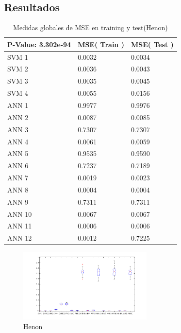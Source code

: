 \documentclass[a4paper,openwrite,12pt]{article}
\begin{document}
\subsection{Resultados}
\begin{table}[H]
\centering
\begin{tabular}{@{}lll@{}}
\toprule
P-Value: 3.302e-94       & MSE( Train ) & MSE( Test ) \\ \midrule
SVM 1                    & 0.0032            & 0.0034           \\
SVM 2                    & 0.0036            & 0.0043           \\
SVM 3                    & 0.0035            & 0.0045           \\
SVM 4                    & 0.0055            & 0.0156           \\
ANN 1                    & 0.9977            & 0.9976           \\
ANN 2                    & 0.0087            & 0.0085           \\
ANN 3                    & 0.7307            & 0.7307           \\
ANN 4                    & 0.0061            & 0.0059           \\
ANN 5                    & 0.9535            & 0.9590           \\
ANN 6                    & 0.7237            & 0.7189           \\
ANN 7                    & 0.0019            & 0.0023           \\
ANN 8                    & 0.0004            & 0.0004           \\
ANN 9                    & 0.7311            & 0.7311           \\
ANN 10                   & 0.0067            & 0.0067           \\
ANN 11                   & 0.0006            & 0.0006           \\
ANN 12                   & 0.0012            & 0.7225           
\end{tabular}
\caption{Medidas globales de MSE en training y test(Henon)}
\label{tab:global_iris}
\end{table}


\begin{figure}[H]
\centering
\includegraphics[width=0.6\textwidth]{img/box_henon.png}
\caption{Henon}
\end{figure}
\end{document}
